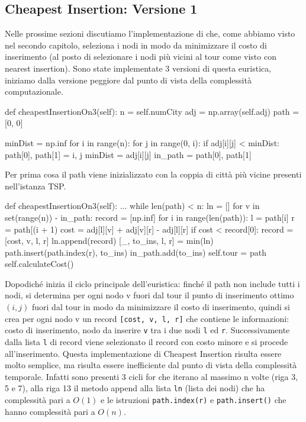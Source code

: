 \documentclass[a4paper,12pt]{report}
\begin{document}
\subsection{Cheapest Insertion: Versione 1}
Nelle prossime sezioni discutiamo l'implementazione di  che, come abbiamo visto nel secondo capitolo, seleziona i nodi in modo da minimizzare il costo di inserimento (al posto di selezionare i nodi più vicini al tour come visto con nearest insertion). Sono state implementate 3 versioni di questa euristica, iniziamo dalla versione peggiore dal punto di vista della complessità computazionale.
\begin{python}
def cheapestInsertionOn3(self):
  n = self.numCity
  adj = np.array(self.adj)
  path = [0, 0]

  minDist = np.inf
  for i in range(n):
    for j in range(0, i):
      if adj[i][j] < minDist:
        path[0], path[1] = i, j
        minDist = adj[i][j]
  in_path = {path[0], path[1]}
\end{python}
Per prima cosa il path viene inizializzato con la coppia di città più vicine presenti nell'istanza TSP.
\begin{python}
def cheapestInsertionOn3(self):
  ...
  while len(path) < n:
    ln = []
    for v in set(range(n)) - in_path:
      record = [np.inf]
      for i in range(len(path)):
        l = path[i]
        r = path[(i + 1) %
        cost = adj[l][v] + adj[v][r] - adj[l][r]
        if cost < record[0]:
          record = [cost, v, l, r]
      ln.append(record)
    [_, to_ins, l, r] = min(ln)
    path.insert(path.index(r), to_ins)
    in_path.add(to_ins)                
  self.tour = path
  self.calculateCost()
\end{python}
Dopodiché inizia il ciclo principale dell'euristica: finché il path non include tutti i nodi, si determina per ogni nodo v fuori dal tour il punto di inserimento ottimo $(i, j)$ fuori dal tour in modo da minimizzare il costo di inserimento, quindi si crea per ogni nodo v un record \lstinline![cost, v, l, r]! che contiene le informazioni: costo di inserimento, nodo da inserire \lstinline!v! tra i due nodi \lstinline!l! ed \lstinline!r!. Successivamente dalla lista \lstinline!l! di record viene selezionato il record con costo minore e si procede all'inserimento. \newline
Questa implementazione di Cheapest Insertion risulta essere molto semplice, ma risulta essere inefficiente dal punto di vista della complessità temporale. Infatti sono presenti 3 cicli for che iterano al massimo n volte (riga 3, 5 e 7), alla riga 13 il metodo append alla lista \lstinline!ln! (lista dei nodi) che ha complessità pari a $O(1)$ e le istruzioni \lstinline!path.index(r)! e \lstinline!path.insert()! che hanno complessità pari a $O(n)$. \newline
\end{document}
